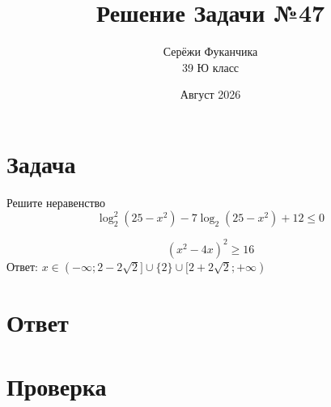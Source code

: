 \documentclass{article}
\title{Решение Задачи №47}
\author{Серёжи Фуканчика\\39 Ю класс}
\date{Август 2026}
\begin{document}
\maketitle

\section{Задача}
Решите неравенство
$$\log_{2}^{2}(25-x^2)-7\log_{2}(25-x^2)+12 \leq 0$$

$$(x^2-4x)^2\ge{}16$$
Ответ: $x\in{}(-\infty;2-2\sqrt{2}]\cup\{2\}\cup{}[2+2\sqrt{2};+\infty)$

\section{Ответ}

\section{Проверка}
\end{document}
